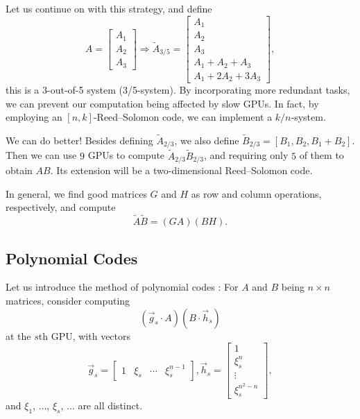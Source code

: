 Let us continue on with this strategy, and define
\begin{equation*}
    A = \left[\begin{matrix}
        A_1 \\ A_2 \\ A_3
    \end{matrix}\right] \Rightarrow \tilde{A}_{3/5} = \left[\begin{matrix}
        A_1 \\ A_2 \\ A_3 \\ A_1+A_2+A_3 \\ A_1+2A_2+3A_3
    \end{matrix}\right],
\end{equation*}
this is a 3-out-of-5 system (3/5-system). By incorporating more redundant tasks, we can prevent our computation being affected by slow GPUs. {\color{red}In fact, by employing an $[n,k]$-Reed--Solomon code, we can implement a $k/n$-system.}

We can do better! Besides defining $\tilde{A}_{2/3}$, we also define $\tilde{B}_{2/3} = [B_1,B_2,B_1+B_2]$. Then we can use $9$ GPUs to compute $\tilde{A}_{2/3}\tilde{B}_{2/3}$, and requiring only $5$ of them to obtain $AB$. Its extension will be a two-dimensional Reed--Solomon code.

In general, we find good matrices $G$ and $H$ as row and column operations, respectively, and compute
\begin{equation}
    \tilde{A}\tilde{B} = (GA)(BH).
\end{equation}

\subsection{Polynomial Codes}
Let us introduce the method of polynomial codes \cite{polynomialcodes}: For $A$ and $B$ being $n\times n$ matrices, consider computing
\begin{equation}
    (\vec{g}_s\cdot A)(B\cdot \vec{h}_s)
\end{equation}
at the $s$th GPU, with vectors
\begin{equation}
    \vec{g}_s = \left[\begin{matrix}
        1 & \xi_s & \cdots & \xi_s^{n-1}
    \end{matrix}\right], \vec{h}_s = \left[\begin{matrix}
        1 \\ \xi_s^n \\ \vdots \\ \xi_s^{n^2-n}
    \end{matrix}\right],
\end{equation}
and $\xi_1$, $\ldots$, $\xi_s$, $\ldots$ are all distinct.

